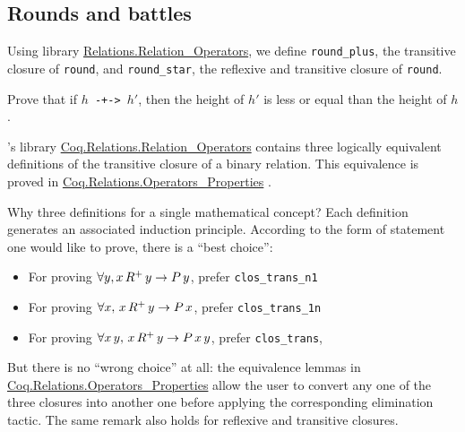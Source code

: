 \subsection{Rounds and battles}


Using library \href{https://coq.inria.fr/distrib/current/stdlib/Coq.Relations.Relation_Operators.html}{Relations.Relation\_Operators}, we define \texttt{round\_plus},  the transitive closure of \texttt{round}, and \texttt{round\_star},  the reflexive and transitive closure of \texttt{round}.

\label{sect:infix-rounds} 




\begin{exercise}
  Prove that if \texttt{$h$ -+-> $h'$}, then
  the height of $h'$ is less or equal than the height of $h$.

\end{exercise}

\begin{remark}
\label{remark:transitive-closure}
\coq's library \href{https://coq.inria.fr/distrib/current/stdlib/Coq.Relations.Relation_Operators.html}{Coq.Relations.Relation\_Operators} 
contains three logically equivalent definitions of the transitive closure of a binary relation. This equivalence is proved in 
\href{https://coq.inria.fr/distrib/current/stdlib/Coq.Relations.Operators_Properties.html}{Coq.Relations.Operators\_Properties} . 

Why three definitions for a single mathematical concept?
Each definition generates an associated induction principle. 
 According to the form of statement one would like to prove, there is a ``best choice'':

\begin{itemize}
\item For proving $\forall y, x\,R^+\,y \;\mbox{$\rightarrow$}\; P\,y$, prefer 
\texttt{clos\_trans\_n1}
\item For proving $\forall x,\,x\,R^+\,y \;\mbox{$\rightarrow$}\; P\,x$, prefer \texttt{clos\_trans\_1n}
\item For proving $\forall x\,y, \,x\,R^+\,y \;\mbox{$\rightarrow$}\;P\,x\,y$,  
prefer \texttt{clos\_trans},
\end{itemize}
But there is no ``wrong choice'' at all: the equivalence lemmas in \linebreak 
\href{https://coq.inria.fr/distrib/current/stdlib/Coq.Relations.Operators_Properties.html}{Coq.Relations.Operators\_Properties} 
 allow the user
to convert any one of the three closures into another one before applying the corresponding elimination tactic.
The same remark also holds for reflexive and transitive closures. 
\end{remark}

